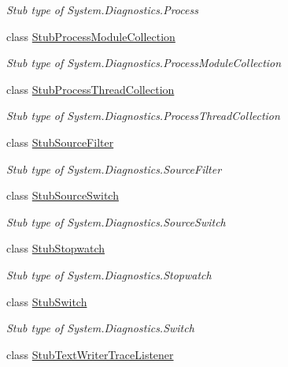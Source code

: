 \begin{DoxyCompactItemize}
\begin{DoxyCompactList}\small\item\em Stub type of System.\-Diagnostics.\-Process\end{DoxyCompactList}\item 
class \hyperlink{class_system_1_1_diagnostics_1_1_fakes_1_1_stub_process_module_collection}{Stub\-Process\-Module\-Collection}
\begin{DoxyCompactList}\small\item\em Stub type of System.\-Diagnostics.\-Process\-Module\-Collection\end{DoxyCompactList}\item 
class \hyperlink{class_system_1_1_diagnostics_1_1_fakes_1_1_stub_process_thread_collection}{Stub\-Process\-Thread\-Collection}
\begin{DoxyCompactList}\small\item\em Stub type of System.\-Diagnostics.\-Process\-Thread\-Collection\end{DoxyCompactList}\item 
class \hyperlink{class_system_1_1_diagnostics_1_1_fakes_1_1_stub_source_filter}{Stub\-Source\-Filter}
\begin{DoxyCompactList}\small\item\em Stub type of System.\-Diagnostics.\-Source\-Filter\end{DoxyCompactList}\item 
class \hyperlink{class_system_1_1_diagnostics_1_1_fakes_1_1_stub_source_switch}{Stub\-Source\-Switch}
\begin{DoxyCompactList}\small\item\em Stub type of System.\-Diagnostics.\-Source\-Switch\end{DoxyCompactList}\item 
class \hyperlink{class_system_1_1_diagnostics_1_1_fakes_1_1_stub_stopwatch}{Stub\-Stopwatch}
\begin{DoxyCompactList}\small\item\em Stub type of System.\-Diagnostics.\-Stopwatch\end{DoxyCompactList}\item 
class \hyperlink{class_system_1_1_diagnostics_1_1_fakes_1_1_stub_switch}{Stub\-Switch}
\begin{DoxyCompactList}\small\item\em Stub type of System.\-Diagnostics.\-Switch\end{DoxyCompactList}\item 
class \hyperlink{class_system_1_1_diagnostics_1_1_fakes_1_1_stub_text_writer_trace_listener}{Stub\-Text\-Writer\-Trace\-Listener}

\end{DoxyCompactItemize}
